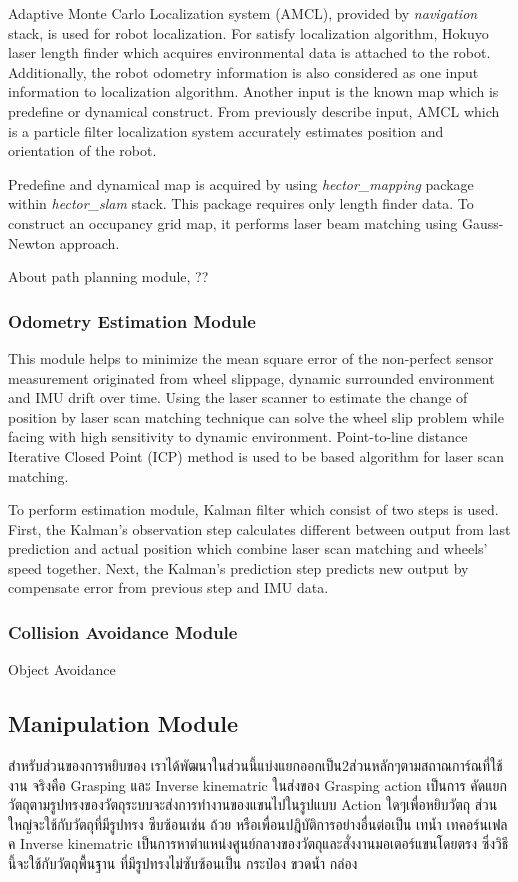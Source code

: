 \documentclass{llncs}
\begin{document}
Adaptive Monte Carlo Localization system (AMCL), provided by \textit{navigation} stack, is used for robot localization. For satisfy localization algorithm, Hokuyo laser length finder which acquires environmental data is attached to the robot. Additionally, the robot odometry information is also considered as one input information to localization algorithm. Another input is the known map which is predefine or dynamical construct. From previously describe input, AMCL which is a particle filter localization system accurately estimates position and orientation of the robot.

Predefine and dynamical map is acquired by using \textit{hector\_mapping} package within \textit{hector\_slam} stack. This package requires only length finder data. To construct an occupancy grid map, it performs laser beam matching using Gauss-Newton approach\cite{hector_slam}.

About path planning module, ??

\subsubsection{Odometry Estimation Module}

This module helps to minimize the mean square error of the non-perfect sensor measurement originated from wheel slippage, dynamic surrounded environment and IMU drift over time. Using the laser scanner to estimate the change of position by laser scan matching technique can solve the wheel slip problem while facing with high sensitivity to dynamic environment. Point-to-line distance Iterative Closed Point (ICP)\cite{icp1}\cite{icp2} method is used to be based algorithm for laser scan matching.

To perform estimation module, Kalman filter which consist of two steps is used. First, the Kalman's observation step calculates different between output from last prediction and actual position which combine laser scan matching and wheels' speed together. Next, the Kalman's prediction step predicts new output by compensate error from previous step and IMU data.

\subsubsection{Collision Avoidance Module}

Object Avoidance

\subsection{Manipulation Module}
 สำหรับส่วนของการหยิบของ เราได้พัฒนาในส่วนนี้แบ่งแยกออกเป็น2ส่วนหลักๆตามสถาณการ์ณที่ใช้งาน จริงคือ Grasping และ Inverse kinematric ในส่งของ Grasping action เป็นการ คัดแยกวัตถุตามรูปทรงของวัตถุระบบจะส่งการทำงานของแขนไปในรูปแบบ Action ใดๆเพื่อหยิบวัตถุ ส่วนใหญ่จะใช้กับวัตถุที่มีรูปทรง ซีบซ้อนเช่น ถ้วย หรือเพื่อนปฎิบัติการอย่างอื่นต่อเป็น เทน้ำ เทคอร์นเฟลค Inverse kinematric เป็นการหาตำแหน่งศูนย์กลางของวัตถุและสั่งงานมอเตอร์แขนโดยตรง ซึ่งวิธีนี้จะใช้กับวัตถุพื้นฐาน ที่มีรูปทรงไม่ซับซ้อนเป็น กระป๋อง ขวดน้ำ กล่อง
\end{document}
